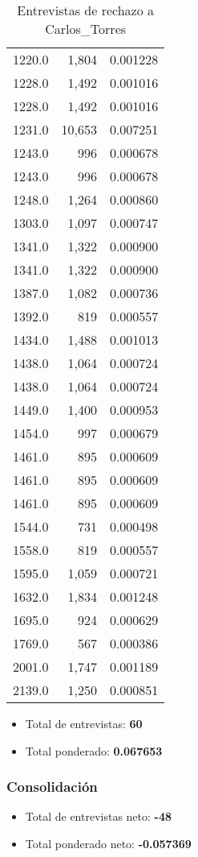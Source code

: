 \documentclass[a4paper,12pt]{article}
\begin{document}
\begin{table}[h]
\begin{tabular}{lrr}
1220.0 & 1,804 & 0.001228 \\ 
1228.0 & 1,492 & 0.001016 \\ 
1228.0 & 1,492 & 0.001016 \\ 
1231.0 & 10,653 & 0.007251 \\ 
1243.0 & 996 & 0.000678 \\ 
1243.0 & 996 & 0.000678 \\ 
1248.0 & 1,264 & 0.000860 \\ 
1303.0 & 1,097 & 0.000747 \\ 
1341.0 & 1,322 & 0.000900 \\ 
1341.0 & 1,322 & 0.000900 \\ 
1387.0 & 1,082 & 0.000736 \\ 
1392.0 & 819 & 0.000557 \\ 
1434.0 & 1,488 & 0.001013 \\ 
1438.0 & 1,064 & 0.000724 \\ 
1438.0 & 1,064 & 0.000724 \\ 
1449.0 & 1,400 & 0.000953 \\ 
1454.0 & 997 & 0.000679 \\ 
1461.0 & 895 & 0.000609 \\ 
1461.0 & 895 & 0.000609 \\ 
1461.0 & 895 & 0.000609 \\ 
1544.0 & 731 & 0.000498 \\ 
1558.0 & 819 & 0.000557 \\ 
1595.0 & 1,059 & 0.000721 \\ 
1632.0 & 1,834 & 0.001248 \\ 
1695.0 & 924 & 0.000629 \\ 
1769.0 & 567 & 0.000386 \\ 
2001.0 & 1,747 & 0.001189 \\ 
2139.0 & 1,250 & 0.000851 \\ 
\bottomrule
\end{tabular}
\caption{Entrevistas de rechazo a Carlos_Torres}
\end{table}

\begin{itemize}
\item Total de entrevistas: \textbf{60}
\item Total ponderado: \textbf{0.067653}
\end{itemize}

\subsubsection*{Consolidación}
\begin{itemize}
\item Total de entrevistas neto: \textbf{-48}
\item Total ponderado neto: \textbf{-0.057369}
\end{itemize}
\end{document}
